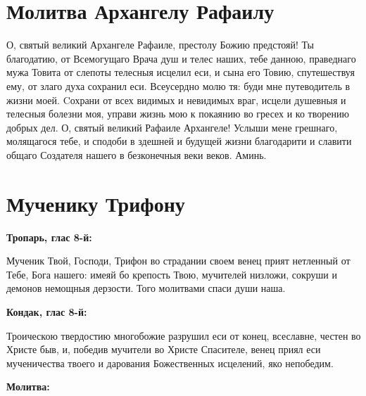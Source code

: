 \section{Молитва Архангелу Рафаилу}
 


О, святый великий Архангеле Рафаиле, престолу Божию предстояй! Ты благодатию, от Всемогущаго Врача душ и телес наших, тебе данною, праведнаго мужа Товита от слепоты телесныя исцелил еси, и сына его Товию, спутешествуя ему, от злаго духа сохранил еси. Всеусердно молю тя: буди мне путеводитель в жизни моей. Cохрани от всех видимых и невидимых враг, исцели душевныя и телесныя болезни моя, управи жизнь мою к покаянию во гресех и ко творению добрых дел. О, святый великий Рафаиле Архангеле! Услыши мене грешнаго, молящагося тебе, и сподоби в здешней и будущей жизни благодарити и славити общаго Создателя нашего в безконечныя веки веков. Аминь. 


\section{Мученику Трифону}
 


\bfseries Тропарь, глас 8-й:\normalfont{}\nopagebreak


Мученик Твой, Господи, Трифон во страдании своем венец прият нетленный от Тебе, Бога нашего: имеяй бо крепость Твою, мучителей низложи, сокруши и демонов немощныя дерзости.  Того молитвами спаси души наша.


\medskip


\bfseries Кондак, глас 8-й:\normalfont{}\nopagebreak


Троическою твердостию многобожие разрушил еси от конец, всеславне, честен во Христе быв, и, победив мучители во Христе Спасителе, венец приял еси мученичества твоего и дарования Божественных исцелений, яко непобедим.


\medskip


\bfseries Молитва:\normalfont{}\nopagebreak


